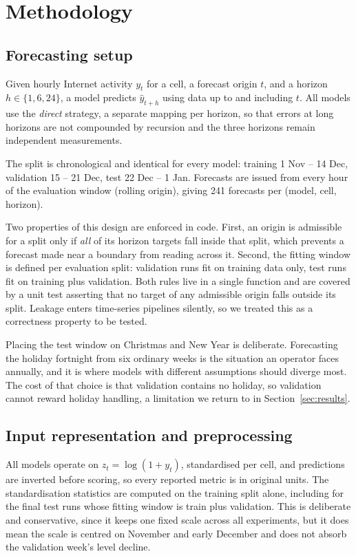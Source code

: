 \documentclass[conference,onecolumn,11pt]{IEEEtran}
\begin{document}
\section{Methodology}
\subsection{Forecasting setup}
Given hourly Internet activity $y_t$ for a cell, a forecast origin $t$, and a horizon $h\in\{1,6,24\}$, a model predicts $\hat y_{t+h}$ using data up to and including $t$. All models use the \emph{direct} strategy, a separate mapping per horizon, so that errors at long horizons are not compounded by recursion and the three horizons remain independent measurements.

The split is chronological and identical for every model: training 1 Nov -- 14 Dec, validation 15 -- 21 Dec, test 22 Dec -- 1 Jan. Forecasts are issued from every hour of the evaluation window (rolling origin), giving 241 forecasts per (model, cell, horizon).

Two properties of this design are enforced in code. First, an origin is admissible for a split only if \emph{all} of its horizon targets fall inside that split, which prevents a forecast made near a boundary from reading across it. Second, the fitting window is defined per evaluation split: validation runs fit on training data only, test runs fit on training plus validation. Both rules live in a single function and are covered by a unit test asserting that no target of any admissible origin falls outside its split. Leakage enters time-series pipelines silently, so we treated this as a correctness property to be tested.

Placing the test window on Christmas and New Year is deliberate. Forecasting the holiday fortnight from six ordinary weeks is the situation an operator faces annually, and it is where models with different assumptions should diverge most. The cost of that choice is that validation contains no holiday, so validation cannot reward holiday handling, a limitation we return to in Section~\ref{sec:results}.

\subsection{Input representation and preprocessing}
All models operate on $z_t=\log(1+y_t)$, standardised per cell, and predictions are inverted before scoring, so every reported metric is in original units. The standardisation statistics are computed on the training split alone, including for the final test runs whose fitting window is train plus validation. This is deliberate and conservative, since it keeps one fixed scale across all experiments, but it does mean the scale is centred on November and early December and does not absorb the validation week's level decline.
\end{document}
